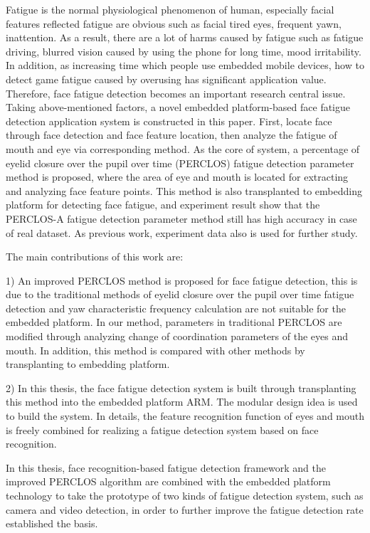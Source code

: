 \begin{eabstract} 
\indent
Fatigue is the normal physiological phenomenon of human, especially facial features reflected fatigue are obvious such as facial tired eyes, frequent yawn, inattention. As a result, there are a lot of harms caused by fatigue such as fatigue driving, blurred vision caused by using the phone for long time, mood irritability. In addition, as increasing time which people use embedded mobile devices, how to detect game fatigue caused by overusing has significant application value. Therefore, face fatigue detection becomes an important research central issue.
Taking above-mentioned factors, a novel embedded platform-based face fatigue detection application system is constructed in this paper. First, locate face through face detection and face feature location, then analyze the fatigue of mouth and eye via corresponding method. As the core of system, a percentage of eyelid closure over the pupil over time (PERCLOS) fatigue detection parameter method is proposed, where the area of eye and mouth is located for extracting and analyzing face feature points. This method is also transplanted to embedding platform for detecting face fatigue, and experiment result show that the PERCLOS-A fatigue detection parameter method still has high accuracy in case of real dataset. As previous work, experiment data also is used for further study. 

The main contributions of this work are:

1) An improved PERCLOS method is proposed for face fatigue detection, this is due to the traditional methods of eyelid closure over the pupil over time fatigue detection and yaw characteristic frequency calculation are not suitable for the embedded platform. In our method, parameters in traditional PERCLOS are modified through analyzing change of coordination parameters of the eyes and mouth. In addition, this method is compared with other methods by transplanting to embedding platform.
 
2) In this thesis, the face fatigue detection system is built through transplanting this method into the embedded platform ARM. The modular design idea is used to build the system. In details, the feature recognition function of eyes and mouth is freely combined for realizing a fatigue detection system based on face recognition. 

In this thesis, face recognition-based fatigue detection framework and the improved PERCLOS algorithm are combined with the embedded platform technology to take the prototype of two kinds of fatigue detection system, such as camera and video detection, in order to further improve the fatigue detection rate established the basis.


\end{eabstract}

